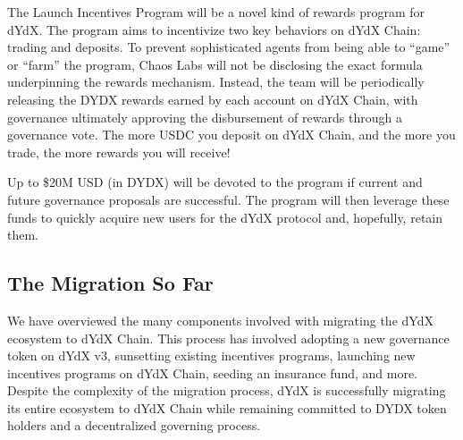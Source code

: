        The Launch Incentives Program will be a novel kind of rewards program for dYdX. The program aims to incentivize two key behaviors on dYdX Chain: trading and deposits. To prevent sophisticated agents from being able to ``game'' or ``farm'' the program, Chaos Labs will not be disclosing the exact formula underpinning the rewards mechanism. Instead, the team will be periodically releasing the DYDX rewards earned by each account on dYdX Chain, with governance ultimately approving the disbursement of rewards through a governance vote. The more USDC you deposit on dYdX Chain, and the more you trade, the more rewards you will receive! 

        Up to \$20M USD (in DYDX) will be devoted to the program if current and future governance proposals are successful. The program will then leverage these funds to quickly acquire new users for the dYdX protocol and, hopefully, retain them.
        
    \subsection{The Migration So Far}

        We have overviewed the many components involved with migrating the dYdX ecosystem to dYdX Chain. This process has involved adopting a new governance token on dYdX v3, sunsetting existing incentives programs, launching new incentives programs on dYdX Chain, seeding an insurance fund, and more. Despite the complexity of the migration process, dYdX is successfully migrating its entire ecosystem to dYdX Chain while remaining committed to DYDX token holders and a decentralized governing process.
